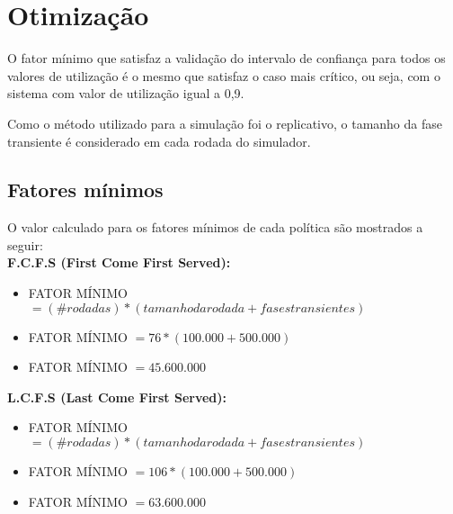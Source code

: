 \chapter{Otimização}

O fator mínimo que satisfaz a validação do intervalo de confiança para todos os valores de utilização é o mesmo que satisfaz o caso mais crítico, ou seja, com o sistema com valor de utilização igual a 0,9.

Como o método utilizado para a simulação foi o replicativo, o tamanho da fase transiente é considerado em cada rodada do simulador.

\section{Fatores mínimos}
\label{sec:fatores}

O valor calculado para os fatores mínimos de cada política são mostrados a seguir:\\

\textbf{F.C.F.S (First Come First Served):}
\begin{itemize}
  \item FATOR MÍNIMO $= (\# rodadas) * (tamanho da rodada + fases transientes)$
  \item FATOR MÍNIMO $= 76 * (100.000 + 500.000)$
  \item FATOR MÍNIMO $= 45.600.000$
\end{itemize}

\textbf{L.C.F.S (Last Come First Served):}
\begin{itemize}
  \item FATOR MÍNIMO $= (\# rodadas) * (tamanho da rodada + fases transientes)$
  \item FATOR MÍNIMO $= 106 * (100.000 + 500.000)$
  \item FATOR MÍNIMO $= 63.600.000$
\end{itemize}
